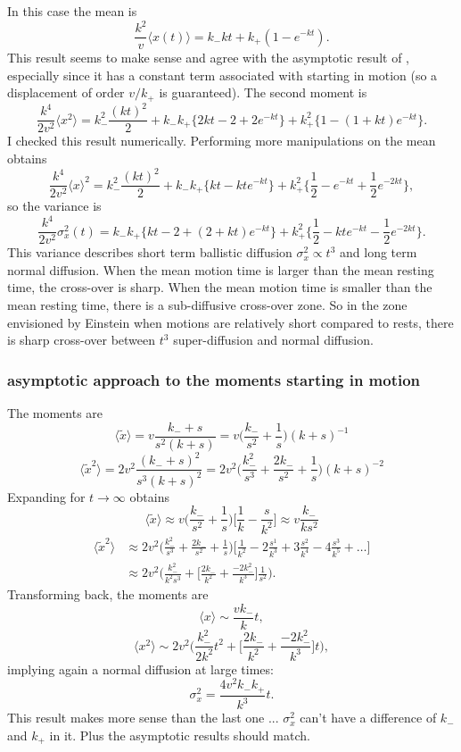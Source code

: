 \documentclass[11pt]{article}
\newcommand\be{\begin{equation}} %
\newcommand\ee{\end{equation}}   %
\newcommand\bra{\langle}
\newcommand\ket{\rangle}
\begin{document}
In this case the mean is
\be  \frac{k^2}{v}\bra x(t) \ket = k_- kt + k_+(1-e^{-kt}).\ee
This result seems to make sense and agree with the asymptotic result of \citet{Lisle1998}, especially since it has a constant term associated with starting in motion (so a displacement of order $v/k_+$ is guaranteed).
The second moment is
\be
\frac{k^4}{2v^2}\bra x^2 \ket = k_-^2\frac{(kt)^2}{2} + k_-k_+\{2kt -2 + 2e^{-kt}\} + k_+^2\{1-(1+kt)e^{-kt}\}.
\ee
I checked this result numerically.
Performing more manipulations on the mean obtains
\be\frac{k^4}{2v^2} \bra x\ket^2 = k_-^2 \frac{(kt)^2}{2} + k_-k_+\{kt - kte^{-kt}\} +  k_+^2\{\frac{1}{2} - e^{-kt} + \frac{1}{2}e^{-2kt}\}   ,\ee
so the variance is
\be \frac{k^4}{2v^2} \sigma_x^2(t) = k_- k_+ \{kt -2 + (2 + kt)e^{-kt}\} + k_+^2\{\frac{1}{2} -kt e^{-kt} - \frac{1}{2}e^{-2kt}\}.\ee
This variance describes short term ballistic diffusion $\sigma_x^2 \propto t^3$ and long term normal diffusion.
When the mean motion time is larger than the mean resting time, the cross-over is sharp.
When the mean motion time is smaller than the mean resting time,
there is a sub-diffusive cross-over zone.
So in the zone envisioned by Einstein when motions are relatively short compared to rests, there is sharp cross-over between $t^3$ super-diffusion and normal diffusion.
\subsubsection{asymptotic approach to the moments starting in motion}
The moments are 
\be \bra \tilde{x} \ket = v \frac{k_- + s}{s^2(k+s)} = v\Big(\frac{k_-}{s^2} + \frac{1}{s}\Big)(k+s)^{-1}\ee
\be \bra \tilde{x}^2 \ket = 2v^2 \frac{(k_-+s)^2}{s^3(k+s)^2} = 2v^2\Big(\frac{k_-^2}{s^3} + \frac{2k_-}{s^2} + \frac{1}{s}\Big)(k+s)^{-2}\ee
 Expanding for $t\rightarrow \infty$ obtains 
 \be \bra \tilde{x} \ket \approx v\Big(\frac{k_-}{s^2} + \frac{1}{s}\Big)\Big[\frac{1}{k} - \frac{s}{k^2} \Big] \approx v\frac{k_-}{ks^2} \ee
 \begin{align} \bra \tilde{x}^2 \ket  &\approx 2v^2\Big(\frac{k_-^2}{s^3} + \frac{2k_-}{s^2} + \frac{1}{s}\Big)\Big[\frac{1}{k^2} - 2\frac{s^1}{k^3} + 3 \frac{s^2}{k^4} - 4 \frac{s^3}{k^5} + \dots\Big] \\
 &\approx 2v^2\Big(\frac{k_-^2}{k^2s^3} + \Big[ \frac{2k_-}{k^2} + \frac{-2k_-^2}{k^3}\Big]\frac{1}{s^2}\Big).
 \end{align}
 Transforming back, the moments are
 \be \bra x \ket \sim \frac{vk_-}{k}t, \ee
 \be \bra x^2 \ket  \sim 2v^2\Big(\frac{k_-^2}{2k^2}t^2+\Big[ \frac{2k_-}{k^2} + \frac{-2k_-^2}{k^3}\Big]t\Big),\ee
 implying again a normal diffusion at large times:
 \be \sigma_x^2 = \frac{4v^2k_-k_+}{k^3}t.\ee
 This result makes more sense than the last one ... 
$\sigma_x^2$ can't have a difference of $k_-$ and $k_+$ in it.
 Plus the asymptotic results should match.
\end{document}
